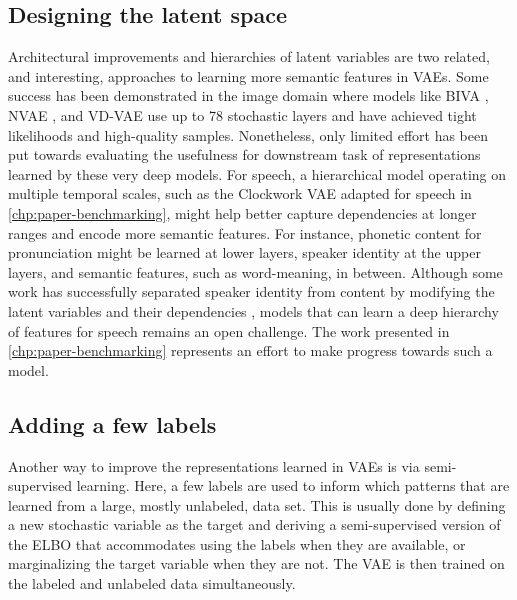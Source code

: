 

\subsection{Designing the latent space} 
Architectural improvements and hierarchies of latent variables are two related, and interesting, approaches to learning more semantic features in VAEs. 
Some success has been demonstrated in the image domain where models like BIVA \parencite{maaloe_biva_2019}, NVAE \parencite{vahdat_nvae_2020}, and VD-VAE \parencite{child_very_2021} use up to 78 stochastic layers and have achieved tight likelihoods and high-quality samples. 
Nonetheless, only limited effort has been put towards evaluating the usefulness for downstream task of representations learned by these very deep models. 
For speech, a hierarchical model operating on multiple temporal scales, such as the Clockwork VAE \parencite{saxena_clockwork_2021} adapted for speech in \cref{chp:paper-benchmarking}, might help better capture dependencies at longer ranges and encode more semantic features. 
For instance, phonetic content for pronunciation might be learned at lower layers, speaker identity at the upper layers, and semantic features, such as word-meaning, in between. 
Although some work has successfully separated speaker identity from content by modifying the latent variables and their dependencies \parencite{hsu_unsupervised_2017}, models that can learn a deep hierarchy of features for speech remains an open challenge. The work presented in \cref{chp:paper-benchmarking} represents an effort to make progress towards such a model. 


\subsection{Adding a few labels} 
Another way to improve the representations learned in VAEs is via semi-supervised learning. 
Here, a few labels are used to inform which patterns that are learned from a large, mostly unlabeled, data set. 
This is usually done by defining a new stochastic variable as the target and deriving a semi-supervised version of the ELBO that accommodates using the labels when they are available, or marginalizing the target variable when they are not. The VAE is then trained on the labeled and unlabeled data simultaneously. 

